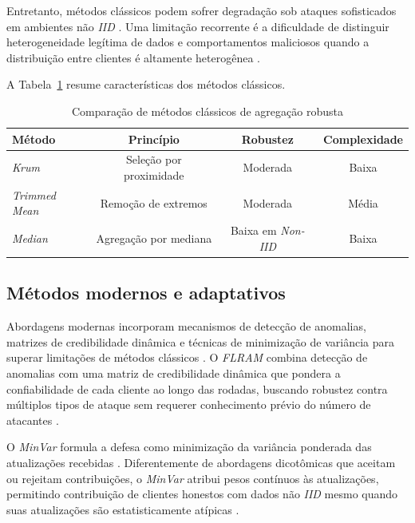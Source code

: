 Entretanto, métodos clássicos podem sofrer degradação sob ataques sofisticados em ambientes não \textit{IID} \cite{Li2023,Chen2023}. Uma limitação recorrente é a dificuldade de distinguir heterogeneidade legítima de dados e comportamentos maliciosos quando a distribuição entre clientes é altamente heterogênea \cite{Li2023,Sikandar2023}.

A Tabela~\ref{tab:metodos-classicos} resume características dos métodos clássicos.

\begin{table}[htbp]
    \centering
    \caption{Comparação de métodos clássicos de agregação robusta}
    \label{tab:metodos-classicos}
    \begin{tabular}{lccc}
        \hline
        \textbf{Método} & \textbf{Princípio} & \textbf{Robustez} & \textbf{Complexidade} \\
        \hline
        \textit{Krum} & Seleção por proximidade & Moderada & Baixa \\
        \textit{Trimmed Mean} & Remoção de extremos & Moderada & Média \\
        \textit{Median} & Agregação por mediana & Baixa em \textit{Non-IID} & Baixa \\
        \hline
    \end{tabular}
\end{table}

\subsection{Métodos modernos e adaptativos}
\label{subsec:metodos-modernos}

Abordagens modernas incorporam mecanismos de detecção de anomalias, matrizes de credibilidade dinâmica e técnicas de minimização de variância para superar limitações de métodos clássicos \cite{Chen2023,Xu2024}. O \textit{FLRAM} combina detecção de anomalias com uma matriz de credibilidade dinâmica que pondera a confiabilidade de cada cliente ao longo das rodadas, buscando robustez contra múltiplos tipos de ataque sem requerer conhecimento prévio do número de atacantes \cite{Chen2023}.

O \textit{MinVar} formula a defesa como minimização da variância ponderada das atualizações recebidas \cite{Xu2024}. Diferentemente de abordagens dicotômicas que aceitam ou rejeitam contribuições, o \textit{MinVar} atribui pesos contínuos às atualizações, permitindo contribuição de clientes honestos com dados não \textit{IID} mesmo quando suas atualizações são estatisticamente atípicas \cite{Xu2024}.

